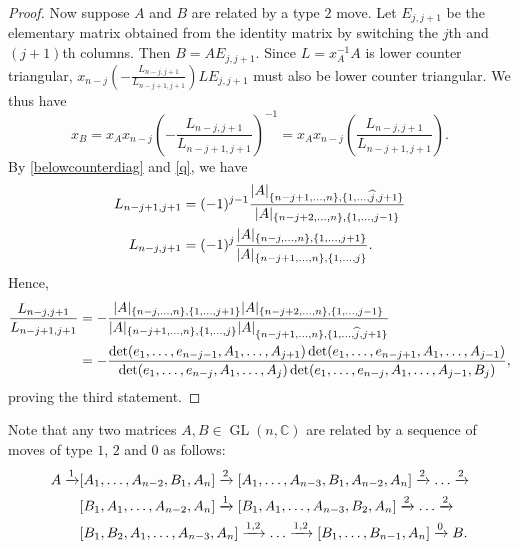 \documentclass[11pt]{amsart}
\theoremstyle{definition}
\numberwithin{equation}{section}
\def\printname#1{
        \if\draft y
                \smash{\makebox[0pt]{\hspace{-0.5in}
                        \raisebox{8pt}{\tt\tiny #1}}}
        \fi
}
\def\lbl#1{\label{#1}\printname{#1}}
\DeclareMathOperator{\GL}{GL}
\DeclarePairedDelimiter{\Norm}{\lvert}{\rvert}
\newcommand{\C}{\mathbb C}
\begin{document}
\begin{proof}
Now suppose $A$ and $B$ are related by a type $2$ move. Let $E_{j,j+1}$ be the elementary matrix obtained from the identity matrix by switching the $j$th and $(j+1)$th columns. Then $B=AE_{j,j+1}$. Since $L=x_A^{-1}A$ is lower counter triangular, $x_{n-j}(-\frac{L_{n-j,j+1}}{L_{n-j+1,j+1}})LE_{j,j+1}$ must also be lower counter triangular. We thus have
\begin{equation}
x_B=x_Ax_{n-j}(-\frac{L_{n-j,j+1}}{L_{n-j+1,j+1}})^{-1}=x_Ax_{n-j}(\frac{L_{n-j,j+1}}{L_{n-j+1,j+1}}).
\end{equation}
By \eqref{belowcounterdiag} and \eqref{q}, we have
\begin{equation}
\begin{aligned}
L_{n-j+1,j+1}&=(-1)^{j-1}\frac{\Norm{A}_{\{n-j+1,\dots,n\},\{1,\dots,\widehat j,j+1\}}}{\Norm{A}_{\{n-j+2,\dots,n\},\{1,\dots,j-1\}}}\\
L_{n-j,j+1}&=(-1)^j\frac{\Norm{A}_{\{n-j,\dots,n\},\{1,\dots,j+1\}}}{\Norm{A}_{\{n-j+1,\dots,n\},\{1,\dots,j\}}}.
\end{aligned}
\end{equation}
Hence,
\begin{align*}
\frac{L_{n-j,j+1}}{L_{n-j+1,j+1}}&=-\frac{\Norm{A}_{\{n-j,\dots,n\},\{1,\dots,j+1\}}\Norm{A}_{\{n-j+2,\dots,n\},\{1,\dots,j-1\}}}{\Norm{A}_{\{n-j+1,\dots,n\},\{1,\dots,j\}}\Norm{A}_{\{n-j+1,\dots,n\},\{1,\dots,\widehat j,j+1\}}}\\&=-
\frac{\det(e_1,\dots,e_{n-j-1},A_1,\dots,A_{j+1})\det(e_1,\dots,e_{n-j+1},A_1,\dots,A_{j-1})}{\det(e_1,\dots,e_{n-j},A_1,\dots,A_j)\det(e_1,\dots,e_{n-j},A_1,\dots,A_{j-1},B_j)},
\end{align*} 
proving the third statement.
\end{proof}

Note that any two matrices $A,B\in\GL(n,\C)$ are related by a sequence of moves of type $1$, $2$ and $0$ as follows:
\begin{equation}\lbl{movestring}
\begin{aligned}A\xrightarrow{1}&[A_1,\dots,A_{n-2},B_1,A_n]\xrightarrow{2}[A_1,\dots,A_{n-3},B_1,A_{n-2},A_n]\xrightarrow
{2}\dots\xrightarrow{2}\\&[B_1,A_1,\dots,A_{n-2},A_n]\xrightarrow{1}[B_1,A_1,\dots,A_{n-3},B_2,A_n]\xrightarrow{2}\dots\xrightarrow{2}\\&[B_1,B_2,A_1,\dots,A_{n-3},A_n]\xrightarrow{1,2}\dots\xrightarrow{1,2}[B_1,\dots,B_{n-1},A_n]\xrightarrow{0}B.
\end{aligned}
\end{equation}
\end{document}
